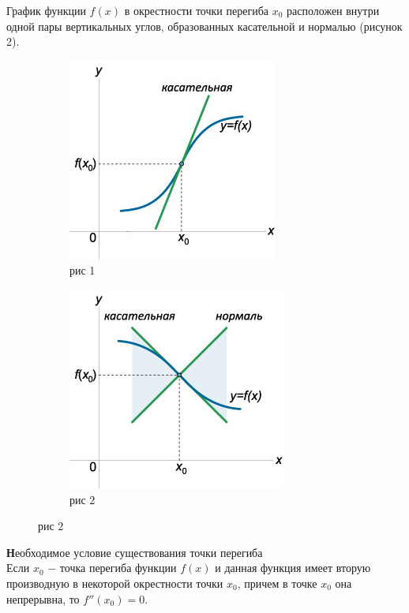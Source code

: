 \documentclass[oneside]{book}
\begin{document}
\begin{itemize}
\begin{enumerate}
График функции $f\left( x \right)$ в окрестности точки перегиба ${x_0}$ расположен внутри одной пары вертикальных углов, образованных касательной и нормалью (рисунок 2).
\begin{figure}
\centering
\begin{subfigure}{.5\textwidth}
  \centering
  \includegraphics[width=.7\linewidth]{./pics/yyy.jpg}
  \caption{рис 1}
\end{subfigure}%
\begin{subfigure}{.5\textwidth}
  \centering
  \includegraphics[width=.7\linewidth]{./pics/yyy2.jpg}
  \caption{рис 2}
\end{subfigure}
\end{figure}
{\textbf Необходимое условие существования точки перегиба} \\
Если ${x_0}$ − точка перегиба функции $f\left( x \right)$ и данная функция имеет вторую производную в некоторой окрестности точки ${x_0}$, причем в точке ${x_0}$ она непрерывна, то $f''\left( {{x_0}} \right) = 0$.

\end{enumerate}
\end{itemize}
\end{document}
